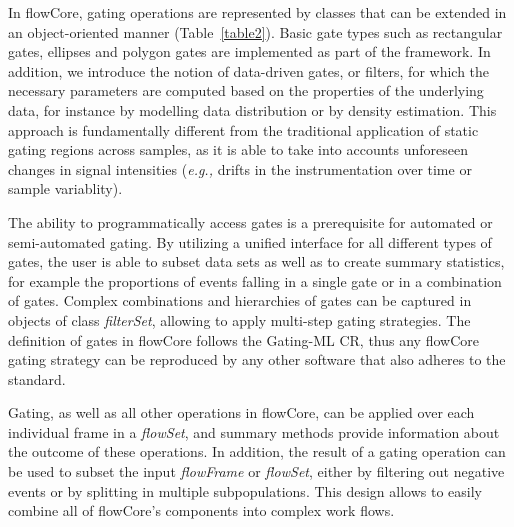 \documentclass[12pt]{article}
\newcommand{\Rpackage}[1]{{\textsf{#1}}}
\newcommand{\Rclass}[1]{{\textit{#1}}}
\begin{document}
In \Rpackage{flowCore}, gating operations are represented by classes
that can be extended in an object-oriented manner
(Table~\ref{table2}). Basic gate types such as rectangular gates,
ellipses and polygon gates are implemented as part of the
framework. In addition, we introduce the notion of data-driven gates,
or filters, for which the necessary parameters are computed based on
the properties of the underlying data, for instance by modelling data
distribution or by density estimation. This approach is fundamentally
different from the traditional application of static gating regions
across samples, as it is able to take into accounts unforeseen changes
in signal intensities (\textit{e.g.,} drifts in the instrumentation
over time or sample variablity).

The ability to programmatically access gates is a prerequisite for
automated or semi-automated gating. By utilizing a unified interface
for all different types of gates, the user is able to subset data sets
as well as to create summary statistics, for example the proportions
of events falling in a single gate or in a combination of
gates. Complex combinations and hierarchies of gates can be captured
in objects of class \Rclass{filterSet}, allowing to apply multi-step
gating strategies. The definition of gates in \Rpackage{flowCore}
follows the Gating-ML CR, thus any \Rpackage{flowCore} gating strategy
can be reproduced by any other software that also adheres to the
standard.

Gating, as well as all other operations in flowCore, can be applied
over each individual frame in a \Rclass{flowSet}, and summary methods
provide information about the outcome of these operations. In
addition, the result of a gating operation can be used to subset the
input \Rclass{flowFrame} or \Rclass{flowSet}, either by filtering out
negative events or by splitting in multiple subpopulations. This
design allows to easily combine all of \Rpackage{flowCore}'s
components into complex work flows.
\end{document}
